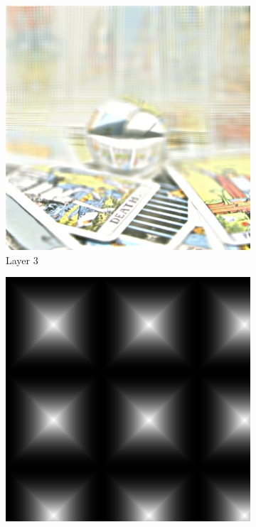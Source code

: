 \begin{figure}[tb]
\begin{subfigure}{0.23\textwidth}
		\vspace{0.15cm}
		
		\includegraphics[width = \textwidth]{../Figures/tiling/tarot_tiles5x5x200x200_overlap0.5_3_layers/3.png}
		\caption{Layer 3}
	\end{subfigure}\hspace{0.15cm}%
	\begin{subfigure}{0.23\textwidth}
		\includegraphics[width = \textwidth]{../Figures/tiling/tarot_tiles3x3x200x200_no_overlap_3_layers/blendingMaskSum.png}
		

\end{subfigure}
\end{figure}
